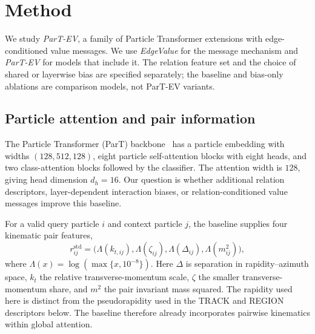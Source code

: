 \section{Method}
\label{sec:method}

We study \emph{ParT-EV}, a family of Particle Transformer extensions with
edge-conditioned value messages. We use \emph{EdgeValue} for the message
mechanism and \emph{ParT-EV} for models that include it. The relation feature
set and the choice of shared or layerwise bias are specified separately;
the baseline and bias-only ablations are comparison models, not ParT-EV variants.

\subsection{Particle attention and pair information}

The Particle Transformer (ParT) backbone~\cite{Qu2022ParticleTransformer} has a
particle embedding with widths $(128,512,128)$, eight particle self-attention
blocks with eight heads, and two class-attention blocks followed by the
classifier. The attention width is $128$, giving head dimension $d_h=16$.
Our question is whether additional relation descriptors, layer-dependent
interaction biases, or relation-conditioned value messages improve this baseline.

For a valid query particle $i$ and context particle $j$, the baseline supplies four kinematic pair features,
\begin{equation}
 r^{\mathrm{std}}_{ij}
 = \bigl(\Lambda(k_{t,ij}),\Lambda(\zeta_{ij}),
          \Lambda(\Delta_{ij}),\Lambda(m^2_{ij})\bigr),
 \label{eq:standard-pairs}
\end{equation}
where $\Lambda(x)=\log(\max\{x,10^{-8}\})$. Here $\Delta$ is separation in
rapidity--azimuth space, $k_t$ the relative transverse-momentum scale,
$\zeta$ the smaller transverse-momentum share, and $m^2$ the pair invariant
mass squared. The rapidity used here is distinct from the pseudorapidity
used in the TRACK and REGION descriptors below. The baseline therefore already
incorporates pairwise kinematics within global attention.

